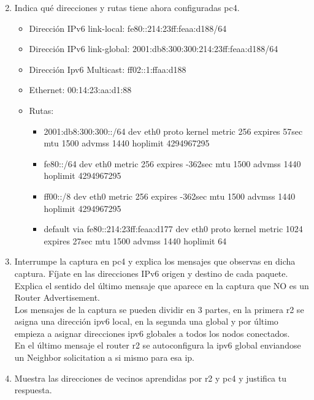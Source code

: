 \documentclass[12pt, a4paper]{report}
\begin{document}
\begin{enumerate}
	\setcounter{enumi}{1}
	\item Indica qué direcciones y rutas tiene ahora configuradas pc4.
	\begin{itemize}
		\item Dirección IPv6 link-local: fe80::214:23ff:feaa:d188/64
		\item Dirección IPv6 link-global: 2001:db8:300:300:214:23ff:feaa:d188/64
		\item Dirección Ipv6 Multicast: ff02::1:ffaa:d188
		\item Ethernet: 00:14:23:aa:d1:88
		\item Rutas:
		\begin{itemize}
			\item 2001:db8:300:300::/64 dev eth0  proto kernel  metric 256  expires 57sec mtu 1500 advmss 1440 hoplimit 4294967295
			\item fe80::/64 dev eth0  metric 256  expires -362sec mtu 1500 advmss 1440 hoplimit 4294967295
			\item ff00::/8 dev eth0  metric 256  expires -362sec mtu 1500 advmss 1440 hoplimit 4294967295
			\item default via fe80::214:23ff:feaa:d177 dev eth0  proto kernel  metric 1024  expires 27sec mtu 1500 advmss 1440 hoplimit 64
			
		\end{itemize}
	\end{itemize}
	\item Interrumpe la captura en pc4 y explica los mensajes que observas en dicha captura. Fíjate en
	las direcciones IPv6 origen y destino de cada paquete. Explica el sentido del último mensaje
	que aparece en la captura que NO es un Router Advertisement.\\
	
	Los mensajes de la captura se pueden dividir en 3 partes, en la primera r2 se asigna una dirección ipv6 local, en la segunda una global y por último empieza a asignar direcciones ipv6 globales a todos los nodos conectados.\\
	En el último mensaje el router r2 se autoconfigura la ipv6 global enviandose un Neighbor solicitation a si mismo para esa ip.
	\item Muestra las direcciones de vecinos aprendidas por r2 y pc4 y justifica tu respuesta.\\
	

\end{enumerate}
\end{document}
